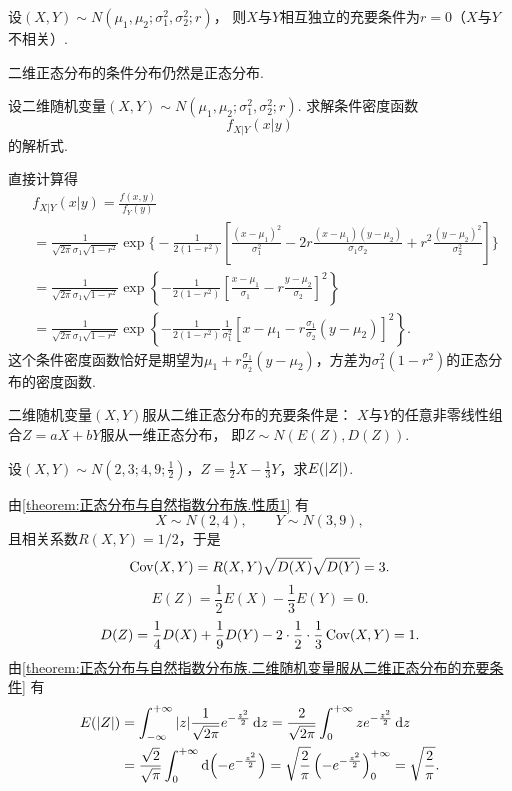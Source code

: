 \begin{corollary}\label{theorem:正态分布与自然指数分布族.性质3}
设\((X,Y) \sim N(\mu_1,\mu_2;\sigma_1^2,\sigma_2^2;r)\)，%
则\(X\)与\(Y\)相互独立的充要条件为\(r=0\)（\(X\)与\(Y\)不相关）.
\end{corollary}

二维正态分布的条件分布仍然是正态分布.
\begin{example}\label{theorem:正态分布与自然指数分布族.性质4}
设二维随机变量\((X,Y) \sim N(\mu_1,\mu_2;\sigma_1^2,\sigma_2^2;r)\).
求解条件密度函数\[
f_{X \vert Y}(x \vert y)
\]的解析式.
\begin{solution}
\def\A{\frac{1}{\sqrt{2\pi}\sigma_1\sqrt{1-r^2}}}%
\def\B{\frac{1}{2(1-r^2)}}%
直接计算得\begin{align*}
&f_{X \vert Y}(x \vert y) = \frac{f(x,y)}{f_Y(y)} \\
&= \A
	\exp\Biggl\{
		- \B
		\left[
			\frac{(x-\mu_1)^2}{\sigma_1^2}
			- 2r\frac{(x-\mu_1)(y-\mu_2)}{\sigma_1\sigma_2}
			+ r^2\frac{(y-\mu_2)^2}{\sigma_2^2}
		\right]
	\Biggr\} \\
&= \A
	\exp\left\{
		- \B
		\left[
			\frac{x-\mu_1}{\sigma_1}
			- r\frac{y-\mu_2}{\sigma_2}
		\right]^2
	\right\} \\
&= \A
	\exp\left\{
		- \B
		\frac{1}{\sigma_1^2}
		\left[
			x - \mu_1
			- r\frac{\sigma_1}{\sigma_2}(y-\mu_2)
		\right]^2
	\right\}.
\end{align*}
这个条件密度函数恰好是期望为\(\mu_1+r\frac{\sigma_1}{\sigma_2}(y-\mu_2)\)，方差为\(\sigma_1^2(1-r^2)\)的正态分布的密度函数.
\end{solution}
\end{example}

\begin{theorem}\label{theorem:正态分布与自然指数分布族.二维随机变量服从二维正态分布的充要条件}
二维随机变量\((X,Y)\)服从二维正态分布的充要条件是：
\(X\)与\(Y\)的任意非零线性组合\(Z=aX+bY\)服从一维正态分布，%
即\(Z \sim N(E(Z),D(Z))\).
\end{theorem}

\begin{example}
设\((X,Y) \sim N\left(2,3;4,9;\frac{1}{2}\right)\)，\(Z = \frac{1}{2} X - \frac{1}{3} Y\)，求\(E(\abs{Z})\).
\begin{solution}
由\cref{theorem:正态分布与自然指数分布族.性质1} 有\[
X \sim N(2,4), \qquad
Y \sim N(3,9),
\]且相关系数\(R(X,Y) = 1/2\)，于是\[
\operatorname{Cov}(X,Y) = R(X,Y) \sqrt{D(X)} \sqrt{D(Y)} = 3.
\]\[
E(Z) = \frac{1}{2} E(X) - \frac{1}{3} E(Y) = 0.
\]\[
D(Z) = \frac{1}{4} D(X) + \frac{1}{9} D(Y)
	- 2 \cdot \frac{1}{2} \cdot \frac{1}{3} \operatorname{Cov}(X,Y)
= 1.
\]
由\cref{theorem:正态分布与自然指数分布族.二维随机变量服从二维正态分布的充要条件} 有\begin{align*}
E(\abs{Z})
&= \int_{-\infty}^{+\infty} \abs{z} \frac{1}{\sqrt{2\pi}} e^{-\frac{z^2}{2}} \dd{z}
= \frac{2}{\sqrt{2\pi}} \int_0^{+\infty} z e^{-\frac{z^2}{2}} \dd{z} \\
&= \frac{\sqrt{2}}{\sqrt{\pi}} \int_0^{+\infty} \dd(-e^{-\frac{z^2}{2}})
= \sqrt{\frac{2}{\pi}} \left(-e^{-\frac{z^2}{2}}\right)_0^{+\infty}
= \sqrt{\frac{2}{\pi}}.
\end{align*}
\end{solution}
\end{example}

